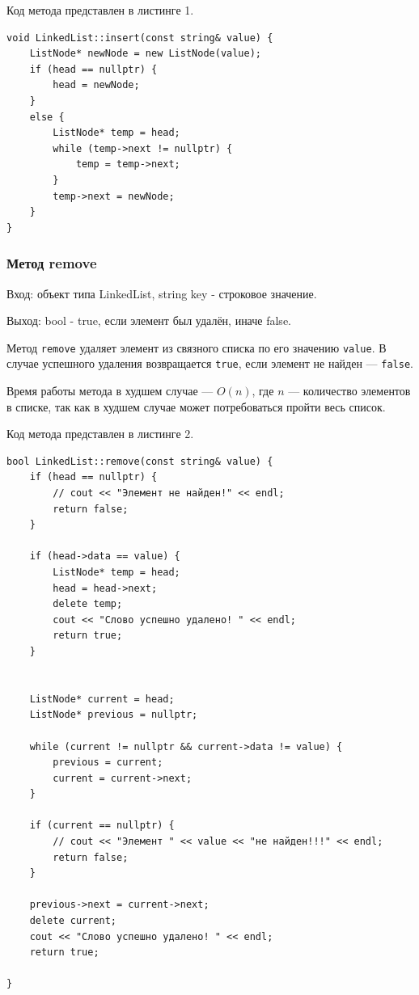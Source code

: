 \documentclass[11pt,a4paper,final]{article} %
\begin{document}
\par Код метода представлен в листинге 1.

\begin{lstlisting}[label=Linkedinsert, caption = Метод insert]
void LinkedList::insert(const string& value) {
	ListNode* newNode = new ListNode(value);
	if (head == nullptr) {
		head = newNode;
	}
	else {
		ListNode* temp = head;
		while (temp->next != nullptr) {
			temp = temp->next;
		}
		temp->next = newNode;
	}
}
\end{lstlisting}

\subsubsection{Метод remove}
Вход: объект типа LinkedList, string key - строковое значение. \par
Выход: bool - true, если элемент был удалён, иначе false. \par

\par Метод \texttt{remove} удаляет элемент из связного списка по его значению \texttt{value}. В случае успешного удаления возвращается \texttt{true}, если элемент не найден — \texttt{false}. 

\par Время работы метода в худшем случае — $O(n)$, где $n$ — количество элементов в списке, так как в худшем случае может потребоваться пройти весь список.

Код метода представлен в листинге 2.
\begin{lstlisting}[label=Linkedremove, caption = Метод remove]
bool LinkedList::remove(const string& value) {
	if (head == nullptr) {
		// cout << "Элемент не найден!" << endl;
		return false;
	}
	
	if (head->data == value) {
		ListNode* temp = head;
		head = head->next;
		delete temp;
		cout << "Слово успешно удалено! " << endl;
		return true;
	}
	
	
	ListNode* current = head;
	ListNode* previous = nullptr;
	
	while (current != nullptr && current->data != value) {
		previous = current;
		current = current->next;
	}
	
	if (current == nullptr) {
		// cout << "Элемент " << value << "не найден!!!" << endl;
		return false;
	}
	
	previous->next = current->next;
	delete current;
	cout << "Слово успешно удалено! " << endl;
	return true;
	
}
\end{lstlisting}
\end{document}
